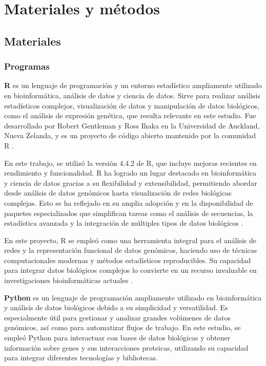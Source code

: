 \section{Materiales y métodos}


\subsection{\textbf{Materiales}}


\subsubsection{Programas}


\textbf{R} es un lenguaje de programación y un entorno estadístico ampliamente utilizado en bioinformática, análisis de datos y ciencia de datos. Sirve para realizar análisis estadísticos complejos, visualización de datos y manipulación de datos biológicos, como el análisis de expresión genética, que resulta relevante en este estudio. Fue desarrollado por Robert Gentleman y Ross Ihaka en la Universidad de Auckland, Nueva Zelanda, y es un proyecto de código abierto mantenido por la comunidad R \cite{jimenez2019introduccion}.


En este trabajo, se utilizó la versión 4.4.2 de R, que incluye mejoras recientes en rendimiento y funcionalidad. R ha logrado un lugar destacado en bioinformática y ciencia de datos gracias a su flexibilidad y extensibilidad, permitiendo abordar desde análisis de datos genómicos hasta visualización de redes biológicas complejas. Esto se ha reflejado en su amplia adopción y en la disponibilidad de paquetes especializados que simplifican tareas como el análisis de secuencias, la estadística avanzada y la integración de múltiples tipos de datos biológicos \cite{Giorgi2022}. 


En este proyecto, R se empleó como una herramienta integral para el análisis de redes y la representación funcional de datos genómicos, haciendo uso de técnicas computacionales modernas y métodos estadísticos reproducibles. Su capacidad para integrar datos biológicos complejos lo convierte en un recurso invaluable en investigaciones bioinformáticas actuales \cite{RLanguaje}.




\textbf{Python} es un lenguaje de programación ampliamente utilizado en bioinformática y análisis de datos biológicos debido a su simplicidad y versatilidad. Es especialmente útil para gestionar y analizar grandes volúmenes de datos genómicos, así como para automatizar flujos de trabajo. En este estudio, se empleó Python para interactuar con bases de datos biológicas y obtener información sobre genes y sus interacciones proteicas, utilizando su capacidad para integrar diferentes tecnologías y bibliotecas.

